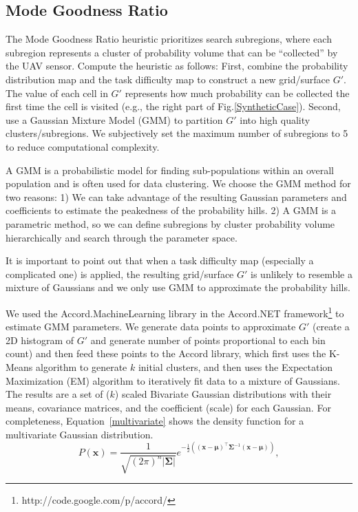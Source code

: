 \documentclass[journal]{IEEEtran}
\begin{document}
\subsection{Mode Goodness Ratio}

The Mode Goodness Ratio heuristic prioritizes search subregions, where each subregion represents a cluster of probability volume that can be ``collected'' by the UAV sensor. Compute the heuristic as follows: First, combine the probability distribution map and the task difficulty map to construct a new grid/surface $G'$. The value of each cell in $G'$ represents how much probability can be collected the first time the cell is visited (e.g., the right part of Fig.\ref{SyntheticCase}). Second, use a Gaussian Mixture Model (GMM) to partition $G'$ into high quality clusters/subregions. We subjectively set the maximum number of subregions to 5 to reduce computational complexity.

A GMM is a probabilistic model for finding sub-populations within an overall population and is often used for data clustering. We choose the GMM method for two reasons: 1) We can take advantage of the resulting Gaussian parameters and coefficients to estimate the peakedness of the probability hills. 2) A GMM is a parametric method, so we can define subregions by cluster probability volume hierarchically and search through the parameter space.

It is important to point out that when a task difficulty map (especially a complicated one) is applied, the resulting grid/surface $G'$ is unlikely to resemble a mixture of Gaussians and we only use GMM to approximate the probability hills.

We used the Accord.MachineLearning library in the Accord.NET framework\footnote{http://code.google.com/p/accord/} to estimate GMM parameters. We generate data points to approximate $G'$ (create a 2D histogram of $G'$ and generate number of points proportional to each bin count) and then feed these points to the Accord library, which first uses the K-Means algorithm to generate $k$ initial clusters, and then uses the Expectation Maximization (EM) algorithm to iteratively fit data to a mixture of Gaussians. The results are a set of ($k$) scaled Bivariate Gaussian distributions with their means, covariance matrices, and the coefficient (scale) for each Gaussian. For completeness, Equation~\ref{multivariate} shows the density function for a multivariate Gaussian distribution.
\begin{equation}
P(\mathbf{x}) = \frac{1}{\sqrt{(2\pi)^n|\mathbf{\Sigma}|}} e^{-\frac{1}{2}\left( (\mathbf{x}-\mathbf{\mu})^{\top}\mathbf{\Sigma}^{-1} (\mathbf{x}-\mathbf{\mu}) \right)} ,
\label{multivariate}
\end{equation}
\end{document}
